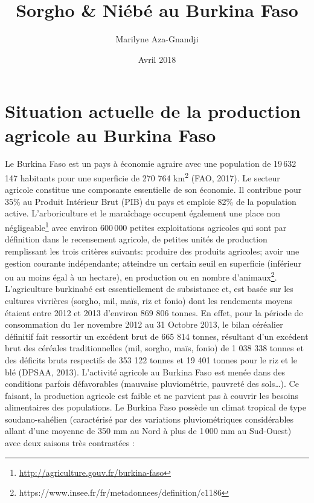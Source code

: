 \documentclass[a4paper,11pt]{article}
\begin{document}
\title{Sorgho \& Niébé au Burkina Faso}
\author{Marilyne Aza-Gnandji}
\date{Avril 2018} 

\maketitle
\tableofcontents

\section{Situation actuelle de la production agricole au Burkina Faso}

Le Burkina Faso est un pays à économie agraire avec une population de
19\,632\,147 habitants pour une superficie de 270 764
km\textsuperscript{2} (FAO, 2017). Le secteur agricole constitue une
composante essentielle de son économie. Il contribue pour 35\% au
Produit Intérieur Brut (PIB) du pays et emploie 82\% de la population
active. L’arboriculture et le maraîchage occupent également une place
non négligeable\footnote{\url{http://agriculture.gouv.fr/burkina-faso}}
avec environ 600\,000 petites exploitations agricoles qui sont par
définition dans le recensement agricole, de petites unités de
production remplissant les trois critères suivants: produire des
produits agricoles; avoir une gestion courante indépendante; atteindre
un certain seuil en superficie (inférieur ou au moins égal à un
hectare), en production ou en nombre
d’animaux\footnote{https://www.insee.fr/fr/metadonnees/definition/c1186}.
L’agriculture burkinabé est essentiellement de subsistance et, est
basée sur les cultures vivrières (sorgho, mil, maïs, riz et fonio)
dont les rendements moyens étaient entre 2012 et 2013 d’environ 869
806 tonnes. En effet, pour la période de consommation du 1er novembre
2012 au 31 Octobre 2013, le bilan céréalier définitif fait ressortir
un excédent brut de 665 814 tonnes, résultant d’un excédent brut des
céréales traditionnelles (mil, sorgho, maïs, fonio) de 1 038 338
tonnes et des déficits bruts respectifs de 353 122 tonnes et 19 401
tonnes pour le riz et le blé (DPSAA, 2013). L’activité agricole au
Burkina Faso est menée dans des conditions parfois défavorables
(mauvaise pluviométrie, pauvreté des sols…). Ce faisant, la production
agricole est faible et ne parvient pas à couvrir les besoins
alimentaires des populations. Le Burkina Faso possède un climat
tropical de type soudano-sahélien (caractérisé par des variations
pluviométriques considérables allant d’une moyenne de 350 mm au Nord à
plus de 1\,000 mm au Sud-Ouest) avec deux saisons très contrastées :
\end{document}
